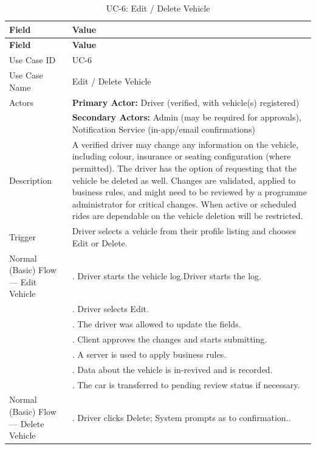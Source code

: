 \begin{longtable}{|>{\raggedright\arraybackslash}p{4cm}|>{\raggedright\arraybackslash}p{11cm}|}
\caption{UC-6: Edit / Delete Vehicle}
\label{tab:uc-6} \\
\hline
\rowcolor{lightgray!30}
\textbf{Field} & \textbf{Value} \\
\hline
\endfirsthead
\hline
\rowcolor{lightgray!30}
\textbf{Field} & \textbf{Value} \\
\hline
\endhead
\hline
\endfoot
\hline
\endlastfoot
Use Case ID & UC-6 \\
\hline
Use Case Name & Edit / Delete Vehicle \\
\hline
Actors & \textbf{Primary Actor:} Driver (verified, with vehicle(s) registered) \\
& \textbf{Secondary Actors:} Admin (may be required for approvals), Notification Service (in-app/email confirmations) \\
\hline
Description & A verified driver may change any information on the vehicle, including colour, insurance or seating configuration (where permitted). The driver has the option of requesting that the vehicle be deleted as well. Changes are validated, applied to business rules, and might need to be reviewed by a programme administrator for critical changes. When active or scheduled rides are dependable on the vehicle deletion will be restricted. \\
\hline
Trigger & Driver selects a vehicle from their profile listing and chooses Edit or Delete. \\
\hline
Normal (Basic) Flow --- Edit Vehicle 
& 1. Driver starts the vehicle log.Driver starts the log. \\
& 2. Driver selects Edit. \\
& 3. The driver was allowed to update the fields. \\
& 4. Client approves the changes and starts submitting. \\
& 5. A server is used to apply business rules. \\
& 6. Data about the vehicle is in-revived and is recorded. \\
& 7. The car is transferred to pending review status if necessary. \\
\hline
Normal (Basic) Flow --- Delete Vehicle & 1. Driver clicks Delete; System prompts as to confirmation.. \\

\end{longtable}
